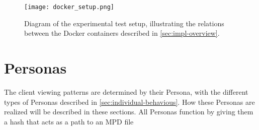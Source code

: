 \begin{figure}[bth]
    \texttt{[image: docker\_setup.png]}
    \caption[Diagram of the experimental test setup]{Diagram of the experimental test setup, illustrating the relations between the Docker containers described in \autoref{sec:impl-overview}.}
    \label{fig:uml_docker-compose}
\end{figure}

\section{Personas}
\label{sec:impl-personas}
The client viewing patterns are determined by their Persona, with the different types of Personas described in \autoref{sec:individual-behavious}. How these Personas are realized will be described in these sections.
All Personas function by giving them a hash that acts as a path to an \ac{MPD} file
